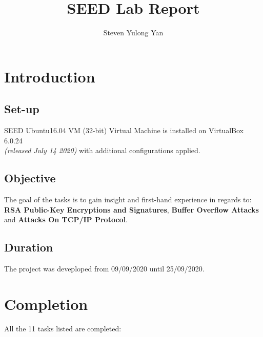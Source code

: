 \documentclass[12pt]{article}
\title{SEED Lab Report}
\author{Steven Yulong Yan}
\begin{document}
\date{}

\maketitle

\tableofcontents



\newpage

\section{Introduction}

\subsection{Set-up}

SEED Ubuntu16.04 VM (32-bit) Virtual Machine \cite{SEEDLabVM} is installed on
VirtualBox 6.0.24 \\
\textit{(released July 14 2020)} \cite{VirtualBox} with additional
configurations applied.

\subsection{Objective}
The goal of the tasks is to gain insight and first-hand experience in regards to:
\textbf{RSA Public-Key Encryptions and Signatures},
\textbf{Buffer Overflow Attacks} and
\textbf{Attacks On TCP/IP Protocol}.

\subsection{Duration}
The project was deveploped from 09/09/2020 until 25/09/2020.

\section{Completion}
All the 11 tasks listed are completed:
\end{document}
